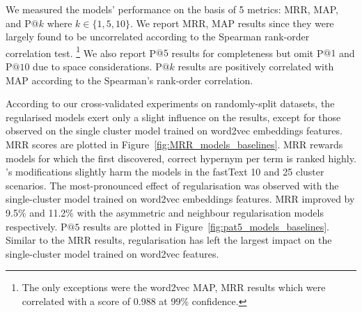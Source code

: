 We measured the models' performance on the basis of 5 metrics: \ac{MRR}, \ac{MAP}, and P$@k$ where $k \in \{1, 5, 10\}$.  We report MRR, MAP results since they were largely found to be uncorrelated according to the Spearman rank-order correlation test. \footnote{The only exceptions were the word2vec MAP, MRR results which were correlated with a score of 0.988 at 99\% confidence.}   We also report P$@5$ results for completeness but omit P$@1$ and P$@10$ due to space considerations.  P$@k$ results are positively correlated with \ac{MAP} according to the Spearman's rank-order correlation.

According to our cross-validated experiments on randomly-split datasets, the regularised models exert only a slight influence on the results, except for those observed on the single cluster model trained on word2vec embeddings features.  MRR scores are plotted in Figure~\ref{fig:MRR_models_baselines}.  MRR rewards models for which the first discovered, correct hypernym per term is ranked highly.  \citeauthor{ustalov2017negative}'s modifications slightly harm the models in the fastText 10 and 25 cluster scenarios.  The most-pronounced effect of regularisation was observed with the single-cluster model trained on word2vec embeddings features.  MRR improved by 9.5\% and 11.2\%  with the asymmetric and neighbour regularisation models respectively.  P$@5$ results are plotted in Figure~\ref{fig:pat5_models_baselines}.  Similar to the MRR results, regularisation has left the largest impact on the single-cluster model trained on word2vec features.
